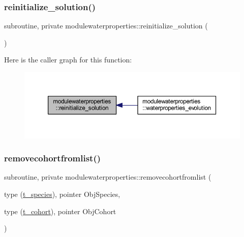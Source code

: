 \subsubsection{\texorpdfstring{reinitialize\+\_\+solution()}{reinitialize\_solution()}}
{\footnotesize\ttfamily subroutine, private modulewaterproperties\+::reinitialize\+\_\+solution (\begin{DoxyParamCaption}{ }\end{DoxyParamCaption})\hspace{0.3cm}{\ttfamily [private]}}

Here is the caller graph for this function\+:\nopagebreak
\begin{figure}[H]
\begin{center}
\leavevmode
\includegraphics[width=350pt]{namespacemodulewaterproperties_a3b050fab4946fe3d8840f4104a85e0ab_icgraph}
\end{center}
\end{figure}
\mbox{\label{namespacemodulewaterproperties_a3ee71384b4a5e160513a569765f2a4ba}} 
\subsubsection{\texorpdfstring{removecohortfromlist()}{removecohortfromlist()}}
{\footnotesize\ttfamily subroutine, private modulewaterproperties\+::removecohortfromlist (\begin{DoxyParamCaption}\item[{type (\mbox{\hyperlink{structmodulewaterproperties_1_1t__species}{t\+\_\+species}}), pointer}]{Obj\+Species,  }\item[{type (\mbox{\hyperlink{structmodulewaterproperties_1_1t__cohort}{t\+\_\+cohort}}), pointer}]{Obj\+Cohort }\end{DoxyParamCaption})\hspace{0.3cm}{\ttfamily [private]}}


